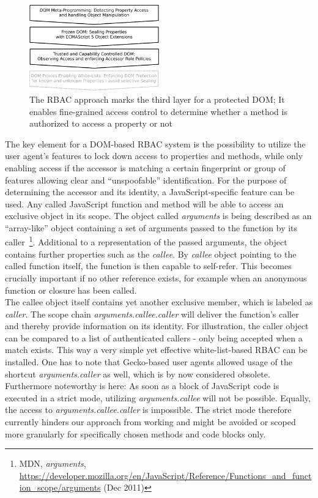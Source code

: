 \begin{figure}[htb]
\centering
\includegraphics[width=0.5\textwidth]{./img/dom-protect-3.pdf}
\caption{The RBAC approach marks the third layer for a protected DOM; It enables fine-grained access control to determine whether a method is authorized to access a property or not}
\label{fig:dom-protect-3}
\end{figure}

    The key element for a DOM-based RBAC system is the possibility to utilize the user agent's features to lock down access to properties and methods, while only enabling access if the accessor is matching a certain fingerprint or group of features allowing clear and ``unspoofable'' identification. For the purpose of determining the accessor and its identity, a JavaScript-specific feature can be used. Any called JavaScript function and method  will be able to access an exclusive object in its scope. The object called \textit{arguments} is being described as an ``array-like'' object containing a set of arguments passed to the function by its caller~\footnote{MDN, \textit{arguments}, \url{https://developer.mozilla.org/en/JavaScript/Reference/Functions\_and\_function\_scope/arguments} (Dec 2011)}. Additional to a representation of the passed arguments, the object contains further properties such as the \textit{callee}. By \textit{callee} object pointing to the called function itself, the function is then capable to self-refer. This becomes crucially important if no other reference exists, for example when an anonymous function or closure has been called. \\

    The callee object itself contains yet another exclusive member, which is labeled as \textit{caller}. The scope chain \textit{arguments.callee.caller} will deliver the function's caller and thereby provide information on its identity. For illustration, the caller object can be compared to a list of authenticated callers - only being accepted when a match exists. This way a very simple yet effective white-list-based RBAC can be installed. One has to note that Gecko-based user agents allowed usage of the shortcut \textit{arguments.caller} as well, which is by now considered obsolete. Furthermore noteworthy is here: As soon as a block of JavaScript code is executed in a strict mode, utilizing \textit{arguments.callee} will not be possible. Equally, the access to \textit{arguments.callee.caller} is impossible. The strict mode therefore currently hinders our approach from working and might be avoided or scoped more granularly for specifically chosen methods and code blocks only.\\ 

